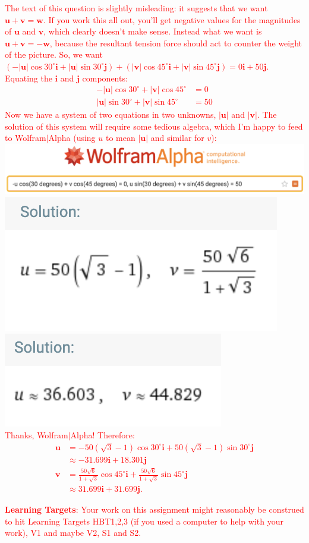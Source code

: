 \documentclass[10pt]{article}
\newcommand{\vu}{\mathbf{u}}
\newcommand{\vv}{\mathbf{v}}
\newcommand{\vw}{\mathbf{w}}
\newcommand{\vi}{\mathbf{i}}
\newcommand{\vj}{\mathbf{j}}
\newcommand{\red}[1]{ %
\textcolor{red}{#1} }%
\begin{document}
\begin{enumerate}[leftmargin=0pt]
\begin{enumerate}
        \red{The text of this question is slightly misleading: it suggests that we want $\vu + \vv = \vw$. If you work this all out, you'll get negative values for the magnitudes of $\vu$ and $\vv$, which clearly doesn't make sense. Instead what we want is $\vu + \vv = -\vw$, because the resultant tension force should act to counter the weight of the picture.
        So, we want $(-|\vu|\cos30^\circ \vi + |\vu|\sin30^\circ \vj) + (|\vv|\cos45^\circ \vi + |\vv|\sin45^\circ \vj) = 0 \vi + 50 \vj$. Equating the $\vi$ and $\vj$ components:
        \begin{align*}
            -|\vu|\cos30^\circ + |\vv|\cos45^\circ &= 0 \\
             |\vu|\sin30^\circ + |\vv|\sin45^\circ &= 50
        \end{align*}
        Now we have a system of two equations in two unknowns, $|\vu|$ and $|\vv|$. The solution of this system will require some tedious algebra, which I'm happy to feed to Wolfram$|$Alpha (using $u$ to mean $|\vu|$ and similar for $v$):
        \\
        \includegraphics[width=\linewidth]{wa-3-1.png} \\
        \includegraphics[width=0.4\linewidth]{wa-3-2.png}
        \includegraphics[width=0.4\linewidth]{wa-3-3.png}\\
        Thanks, Wolfram$|$Alpha! Therefore:
        \begin{align*}
            \vu &= - 50(\sqrt{3} - 1) \cos30^\circ \vi + 50(\sqrt{3} - 1) \sin30^\circ \vj\\
            &\approx -31.699 \vi + 18.301 \vj \\
            \vv &= \frac{50\sqrt{6}}{1+\sqrt{3}}\cos45^\circ\vi + \frac{50\sqrt{6}}{1+\sqrt{3}}\sin45^\circ\vj\\
            &\approx 31.699 \vi + 31.699 \vj.
        \end{align*}
        }
    \end{enumerate}
\end{enumerate}

\red{\textbf{Learning Targets}: Your work on this assignment might reasonably be construed to hit Learning Targets HBT1,2,3 (if you used a computer to help with your work), V1 and maybe V2, S1 and S2.}
\end{document}
